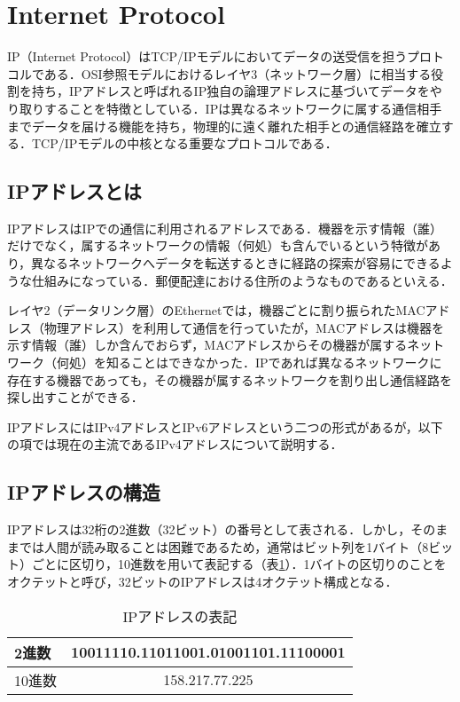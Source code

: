 \section{Internet Protocol}
IP（Internet Protocol）はTCP/IPモデルにおいてデータの送受信を担うプロトコルである．OSI参照モデルにおけるレイヤ3（ネットワーク層）に相当する役割を持ち，IPアドレスと呼ばれるIP独自の論理アドレスに基づいてデータをやり取りすることを特徴としている．IPは異なるネットワークに属する通信相手までデータを届ける機能を持ち，物理的に遠く離れた相手との通信経路を確立する．TCP/IPモデルの中核となる重要なプロトコルである．

\subsection{IPアドレスとは}
IPアドレスはIPでの通信に利用されるアドレスである．機器を示す情報（誰）だけでなく，属するネットワークの情報（何処）も含んでいるという特徴があり，異なるネットワークへデータを転送するときに経路の探索が容易にできるような仕組みになっている．郵便配達における住所のようなものであるといえる．

レイヤ2（データリンク層）のEthernetでは，機器ごとに割り振られたMACアドレス（物理アドレス）を利用して通信を行っていたが，MACアドレスは機器を示す情報（誰）しか含んでおらず，MACアドレスからその機器が属するネットワーク（何処）を知ることはできなかった．IPであれば異なるネットワークに存在する機器であっても，その機器が属するネットワークを割り出し通信経路を探し出すことができる．

IPアドレスにはIPv4アドレスとIPv6アドレスという二つの形式があるが，以下の項では現在の主流であるIPv4アドレスについて説明する．

\subsection{IPアドレスの構造}
IPアドレスは32桁の2進数（32ビット）の番号として表される．しかし，そのままでは人間が読み取ることは困難であるため，通常はビット列を1バイト（8ビット）ごとに区切り，10進数を用いて表記する（表\ref{tab:ip_des}）．1バイトの区切りのことをオクテットと呼び，32ビットのIPアドレスは4オクテット構成となる．

\begin{table}[htb]
  \begin{center}
    \caption{IPアドレスの表記}
    \begin{tabular}{|l||c|} \hline
      2進数 & 10011110.11011001.01001101.11100001 \\ \hline
      10進数 & 158.217.77.225 \\ \hline
    \end{tabular}
    \label{tab:ip_des}
  \end{center}
\end{table}

